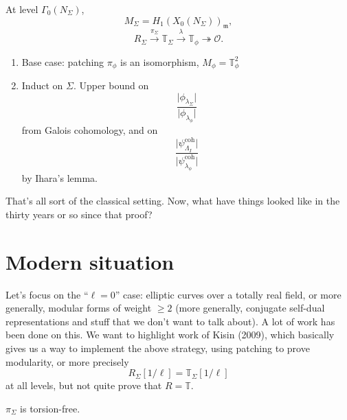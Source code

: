 \documentclass[reqno]{amsart} 
\begin{document}
At level $\Gamma_0(N_{\Sigma})$,
\begin{equation*}
  M_{\Sigma} = H_1(X_0(N_{\Sigma}))_{\mathfrak{m}},
\end{equation*}
\begin{equation*}
  R_{\Sigma} \xrightarrow{\pi_{\Sigma}} \mathbb{T}_{\Sigma}
  \xrightarrow{\lambda} \mathbb{T}_{\phi} \twoheadrightarrow \mathcal{O}.
\end{equation*}
\begin{enumerate}
\item Base case: patching $\pi_{\phi}$ is an isomorphism, $M_{\phi} = \mathbb{T}_{\phi}^2$
\item Induct on $\Sigma$.  Upper bound on
  \begin{equation*}
    \frac{\lvert \phi_{\lambda_\Sigma} \rvert}{\lvert \phi_{\lambda_\phi} \rvert}
  \end{equation*}
  from Galois cohomology, and on
  \begin{equation*}
    \frac{\lvert \psi_{\Lambda_{I}}^{\mathrm{coh}} \rvert}{\lvert \psi_{\lambda_\phi}^{\mathrm{coh}} \rvert}
  \end{equation*}
  by Ihara's lemma.
\end{enumerate}

That's all sort of the classical setting.  Now, what have things looked like in the thirty years or so since that proof?

\section{Modern situation}
Let's focus on the ``$\ell = 0$'' case: elliptic curves over a totally real field, or more generally, modular forms of weight $\geq 2$ (more generally, conjugate self-dual representations and stuff that we don't want to talk about).  A lot of work has been done on this.  We want to highlight work of Kisin (2009), which basically gives us a way to implement the above strategy, using patching to prove modularity, or more precisely
\begin{equation*}
  R_{\Sigma}[1 / \ell] = \mathbb{T}_{\Sigma}[1/\ell]
\end{equation*}
at all levels, but not quite prove that $R = \mathbb{T}$.

$\pi_{\Sigma}$ is torsion-free.
\end{document}
